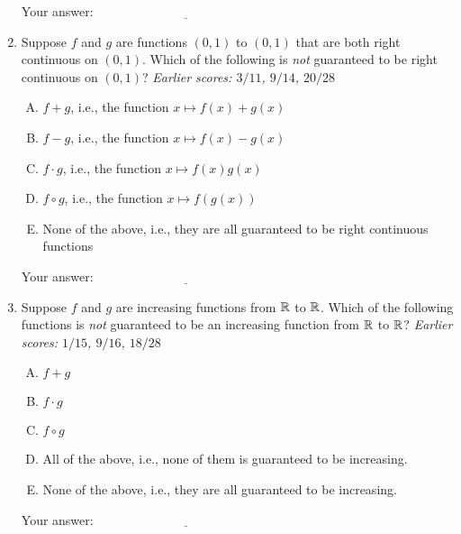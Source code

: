 \documentclass[10pt]{amsart}
\begin{document}
\begin{enumerate}
  
  \vspace{0.05in}
  Your answer: $\underline{\qquad\qquad\qquad\qquad\qquad\qquad\qquad}$
  \vspace{0.05in}

\item Suppose $f$ and $g$ are functions $(0,1)$ to $(0,1)$ that are
  both right continuous on $(0,1)$. Which of the following is {\em
  not} guaranteed to be right continuous on $(0,1)$? {\em Earlier
  scores: $3/11$, $9/14$, $20/28$}

  \begin{enumerate}[(A)]
  \item $f + g$, i.e., the function $x \mapsto f(x) + g(x)$
  \item $f - g$, i.e., the function $x \mapsto f(x) - g(x)$
  \item $f \cdot g$, i.e., the function $x \mapsto f(x)g(x)$
  \item $f \circ g$, i.e., the function $x \mapsto f(g(x))$
  \item None of the above, i.e., they are all guaranteed to be right
    continuous functions
  \end{enumerate}

  \vspace{0.05in}
  Your answer: $\underline{\qquad\qquad\qquad\qquad\qquad\qquad\qquad}$
  \vspace{0.05in}

\item Suppose $f$ and $g$ are increasing functions from $\mathbb{R}$ to
  $\mathbb{R}$. Which of the following functions is {\em not} guaranteed to be
  an increasing function from $\mathbb{R}$ to $\mathbb{R}$? {\em Earlier scores:
  $1/15$, $9/16$, $18/28$}

  \begin{enumerate}[(A)]

  \item $f + g$
  \item $f \cdot g$
  \item $f \circ g$
  \item All of the above, i.e., none of them is guaranteed to be increasing.
  \item None of the above, i.e., they are all guaranteed to be increasing.
  \end{enumerate}

  \vspace{0.05in}
  Your answer: $\underline{\qquad\qquad\qquad\qquad\qquad\qquad\qquad}$
  \vspace{0.05in}


\end{enumerate}
\end{document}
